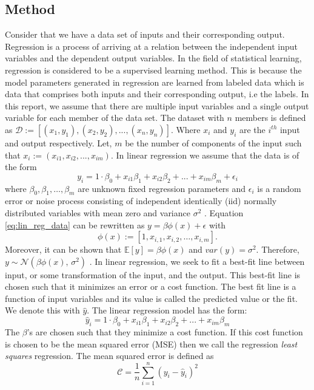 \subsection{Method} \label{subsec:method_linear_regression}

Consider that we have a data set of inputs and their corresponding output. Regression is a process of arriving at a relation between the independent input variables and the dependent output variables. In the field of statistical learning, regression is considered to be a supervised learning method. This is because the model parameters generated in regression are learned from labeled data which is data that comprises both inputs and their corresponding output, i.e the labels. In this report, we assume that there are multiple input variables and a single output variable for each member of the data set.
\newline \newline
The dataset with $n$ members is defined as $\mathcal{D} := [({x}_1, y_1 ), ({x}_2, y_2 ), ..., ({x}_n, y_n )]$. Where ${x}_i$ and $y_i$  are the $i^{th}$ input and output respectively. Let, $m$ be the number of components of the input such that ${x}_i := (x_{i1}, x_{i2}, ..., x_{im})$. In linear regression we assume that the data is of the form
\begin{equation}
    {y}_i = 1 \cdot\beta_0 + x_{i1}\beta_1 + x_{i2}\beta_2 + ... + x_{im}\beta_m + \epsilon_i \label{eq:lin_reg_data}
\end{equation}
where $\beta_0, \beta_1, \dots, \beta_m$ are unknown fixed regression parameters and $\epsilon_i$ is a random error or noise process consisting of independent identically (iid) normally distributed variables with mean zero and variance $\sigma^2$ \cite{shumway_time_2017}. Equation \ref{eq:lin_reg_data} can be rewritten as $y=\beta \phi(x) + \epsilon$ with
\begin{equation}
    \phi(x):=[1, x_{i,1}, x_{i,2}, \dots, x_{i,m}].
\end{equation}
Moreover, it can be shown that $\mathbb{E}[y] = \beta \phi(x)$ and $var(y) = \sigma^2$. Therefore, $y \sim \mathcal{N}(\beta \phi(x),\,\sigma^{2})$ \cite{murphy_machine_2012}.
\newline \newline
In linear regression, we seek to fit a best-fit line between input, or some transformation of the input, and the output. This best-fit line is chosen such that it minimizes an error or a cost function. The best fit line is a function of input variables and its value is called the predicted value or the fit. We denote this with $\hat{y}$. The linear regression model has the form:
\begin{equation}
    \hat{y}_i = 1 \cdot\beta_0 + x_{i1}\beta_1 + x_{i2}\beta_2 + ... + x_{im}\beta_m
\end{equation}
The $\beta$'s are chosen such that they minimize a cost function. If this cost function is chosen to be the mean squared error (MSE) then we call the regression \textit{least squares} regression. The mean squared error is defined as 
\begin{equation}
    \mathcal{C} = \frac{1}{n}\sum_{i=1}^{n}(y_i-\hat{y}_i)^2 \label{eq:cost_function_sum}
\end{equation}

